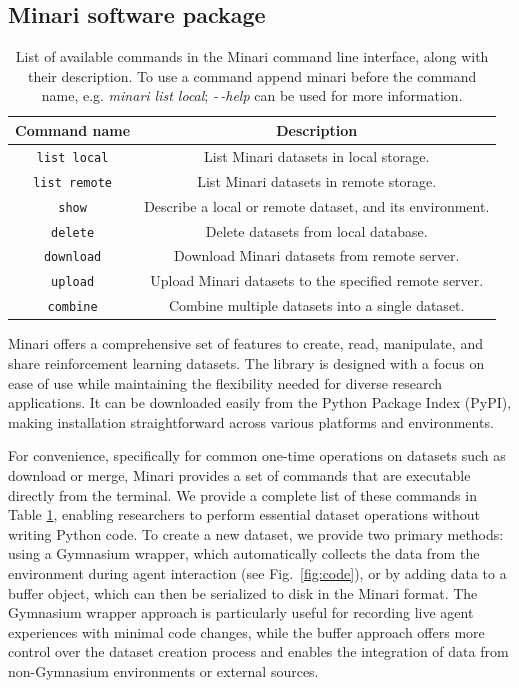 \documentclass{article}
\newcommand\bashstyle{\lstset{
language=bash,
basicstyle=\ttm,
morekeywords={},              %
keywordstyle=\ttm,%
emph={},          %
emphstyle=\ttb\color{deepred},    %
stringstyle=\color{deepgreen},
frame=tb,                         %
showstringspaces=false
}}
\newcommand\bashinline[1]{{\bashstyle\lstinline!#1!}}
\begin{document}
\subsection{Minari software package}
\begin{table}[]
    \centering
    \begin{tabular}{cc}
    \toprule
    \textbf{Command name} & \textbf{Description}\\
    \midrule
     \bashinline{list local} & List Minari datasets in local storage. \\
     \bashinline{list remote} & List Minari datasets in remote storage. \\
     \bashinline{show} & Describe a local or remote dataset, and its environment. \\
     \bashinline{delete} & Delete datasets from local database. \\
     \bashinline{download} & Download Minari datasets from remote server.\\
     \bashinline{upload} & Upload Minari datasets to the specified remote server. \\
     \bashinline{combine} & Combine multiple datasets into a single dataset.\\
     \bottomrule
    \end{tabular}
    \caption{List of available commands in the Minari command line interface, along with their description. To use a command append minari before the command name, e.g. \textit{minari list local}; \textit{-\,-help} can be used for more information.}
    \label{tab:cli}
\end{table}

Minari offers a comprehensive set of features to create, read, manipulate, and share reinforcement learning datasets. The library is designed with a focus on ease of use while maintaining the flexibility needed for diverse research applications. It can be downloaded easily from the Python Package Index (PyPI), making installation straightforward across various platforms and environments.

For convenience, specifically for common one-time operations on datasets such as download or merge, Minari provides a set of commands that are executable directly from the terminal. We provide a complete list of these commands in Table \ref{tab:cli}, enabling researchers to perform essential dataset operations without writing Python code.
To create a new dataset, we provide two primary methods: using a Gymnasium wrapper, which automatically collects the data from the environment during agent interaction (see Fig.~\ref{fig:code}), or by adding data to a buffer object, which can then be serialized to disk in the Minari format. The Gymnasium wrapper approach is particularly useful for recording live agent experiences with minimal code changes, while the buffer approach offers more control over the dataset creation process and enables the integration of data from non-Gymnasium environments or external sources.
\end{document}
